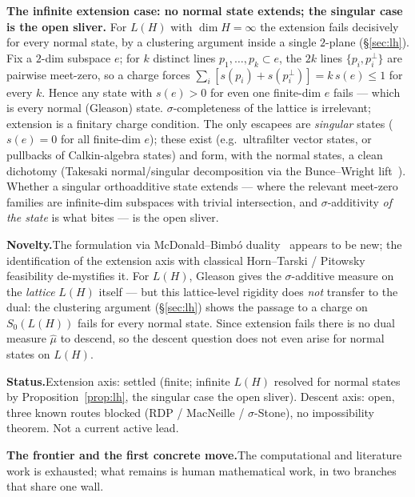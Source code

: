 \documentclass[11pt]{article}
\theoremstyle{definition}
\begin{document}
\medskip\noindent
\textbf{The infinite extension case: no normal state extends; the
singular case is the open sliver.}  For $L(H)$ with $\dim H = \infty$
the extension fails decisively for every normal state, by a clustering
argument inside a single $2$-plane (\S\ref{sec:lh}).  Fix a $2$-dim
subspace $e$; for $k$ distinct lines $p_1, \dots, p_k \subset e$, the
$2k$ lines $\{p_i, p_i^\perp\}$ are pairwise meet-zero, so a charge
forces $\sum_i [s(p_i) + s(p_i^\perp)] = k\, s(e) \leq 1$ for every $k$.
Hence any state with $s(e) > 0$ for even one finite-dim $e$ fails ---
which is every normal (Gleason) state.  $\sigma$-completeness of the
lattice is irrelevant; extension is a finitary charge condition.  The
only escapees are \emph{singular} states ($s(e) = 0$ for all finite-dim
$e$); these exist (e.g.\ ultrafilter vector states, or pullbacks of
Calkin-algebra states) and form, with the normal states, a clean
dichotomy (Takesaki normal/singular decomposition via the Bunce--Wright
lift~\cite{BunceWright1992}).  Whether a singular orthoadditive state
extends --- where the relevant meet-zero families are infinite-dim
subspaces with trivial intersection, and $\sigma$-additivity \emph{of
the state} is what bites --- is the open sliver.

\medskip\noindent
\textbf{Novelty.}\enspace The formulation via McDonald--Bimb\'{o}
duality~\cite{McDonaldBimbo2023} appears to be new; the
identification of the extension axis with classical Horn--Tarski /
Pitowsky feasibility de-mystifies it.  For $L(H)$, Gleason gives the
$\sigma$-additive measure on the \emph{lattice} $L(H)$ itself --- but
this lattice-level rigidity does \emph{not} transfer to the dual: the
clustering argument (\S\ref{sec:lh}) shows the passage to a charge on
$S_0(L(H))$ fails for every normal state.  Since extension fails there
is no dual measure $\hat\mu$ to descend, so the descent question does
not even arise for normal states on $L(H)$.

\medskip\noindent
\textbf{Status.}\enspace Extension axis: settled (finite; infinite
$L(H)$ resolved for normal states by Proposition~\ref{prop:lh}, the
singular case the open sliver).  Descent axis: open, three known routes
blocked (RDP / MacNeille / $\sigma$-Stone), no impossibility theorem.
Not a current active lead.

\medskip\noindent
\textbf{The frontier and the first concrete move.}\enspace The
computational and literature work is exhausted; what remains is human
mathematical work, in two branches that share one wall.
\end{document}
